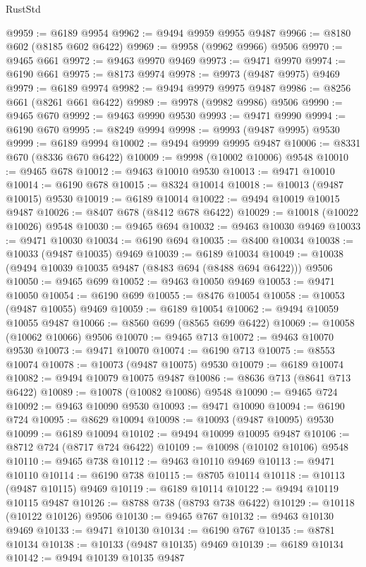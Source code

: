 \begin{lexlean}{RustStd}
\begin{coremodule}
@9959 := @6189 @9954
@9962 := @9494 @9959 @9955 @9487
@9966 := @8180 @602 (@8185 @602 @6422)
@9969 := @9958 (@9962 @9966) @9506
@9970 := @9465 @661
@9972 := @9463 @9970 @9469
@9973 := @9471 @9970
@9974 := @6190 @661
@9975 := @8173 @9974
@9978 := @9973 (@9487 @9975) @9469
@9979 := @6189 @9974
@9982 := @9494 @9979 @9975 @9487
@9986 := @8256 @661 (@8261 @661 @6422)
@9989 := @9978 (@9982 @9986) @9506
@9990 := @9465 @670
@9992 := @9463 @9990 @9530
@9993 := @9471 @9990
@9994 := @6190 @670
@9995 := @8249 @9994
@9998 := @9993 (@9487 @9995) @9530
@9999 := @6189 @9994
@10002 := @9494 @9999 @9995 @9487
@10006 := @8331 @670 (@8336 @670 @6422)
@10009 := @9998 (@10002 @10006) @9548
@10010 := @9465 @678
@10012 := @9463 @10010 @9530
@10013 := @9471 @10010
@10014 := @6190 @678
@10015 := @8324 @10014
@10018 := @10013 (@9487 @10015) @9530
@10019 := @6189 @10014
@10022 := @9494 @10019 @10015 @9487
@10026 := @8407 @678 (@8412 @678 @6422)
@10029 := @10018 (@10022 @10026) @9548
@10030 := @9465 @694
@10032 := @9463 @10030 @9469
@10033 := @9471 @10030
@10034 := @6190 @694
@10035 := @8400 @10034
@10038 := @10033 (@9487 @10035) @9469
@10039 := @6189 @10034
@10049 := @10038 (@9494 @10039 @10035 @9487 (@8483 @694 (@8488 @694 @6422))) @9506
@10050 := @9465 @699
@10052 := @9463 @10050 @9469
@10053 := @9471 @10050
@10054 := @6190 @699
@10055 := @8476 @10054
@10058 := @10053 (@9487 @10055) @9469
@10059 := @6189 @10054
@10062 := @9494 @10059 @10055 @9487
@10066 := @8560 @699 (@8565 @699 @6422)
@10069 := @10058 (@10062 @10066) @9506
@10070 := @9465 @713
@10072 := @9463 @10070 @9530
@10073 := @9471 @10070
@10074 := @6190 @713
@10075 := @8553 @10074
@10078 := @10073 (@9487 @10075) @9530
@10079 := @6189 @10074
@10082 := @9494 @10079 @10075 @9487
@10086 := @8636 @713 (@8641 @713 @6422)
@10089 := @10078 (@10082 @10086) @9548
@10090 := @9465 @724
@10092 := @9463 @10090 @9530
@10093 := @9471 @10090
@10094 := @6190 @724
@10095 := @8629 @10094
@10098 := @10093 (@9487 @10095) @9530
@10099 := @6189 @10094
@10102 := @9494 @10099 @10095 @9487
@10106 := @8712 @724 (@8717 @724 @6422)
@10109 := @10098 (@10102 @10106) @9548
@10110 := @9465 @738
@10112 := @9463 @10110 @9469
@10113 := @9471 @10110
@10114 := @6190 @738
@10115 := @8705 @10114
@10118 := @10113 (@9487 @10115) @9469
@10119 := @6189 @10114
@10122 := @9494 @10119 @10115 @9487
@10126 := @8788 @738 (@8793 @738 @6422)
@10129 := @10118 (@10122 @10126) @9506
@10130 := @9465 @767
@10132 := @9463 @10130 @9469
@10133 := @9471 @10130
@10134 := @6190 @767
@10135 := @8781 @10134
@10138 := @10133 (@9487 @10135) @9469
@10139 := @6189 @10134
@10142 := @9494 @10139 @10135 @9487

\end{coremodule}
\end{lexlean}
